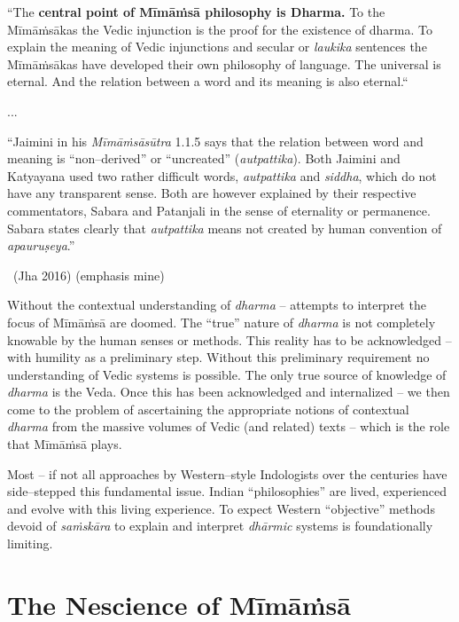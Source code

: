 \begin{myquote}
“The \textbf{central point of Mīmāṁsā philosophy is Dharma.} To the Mīmāṁsākas the Vedic injunction is the proof for the existence of dharma. To explain the meaning of Vedic injunctions and secular or \textit{laukika} sentences the Mīmāṁsākas have developed their own philosophy of language. The universal is eternal. And the relation between a word and its meaning is also eternal.“
\end{myquote}

\begin{myquote}
...
\end{myquote}

\begin{myquote}
“Jaimini in his \textit{Mīmāṁsāsūtra} 1.1.5 says that the relation between word and meaning is “non–derived” or “uncreated” (\textit{autpattika}). Both Jaimini and Katyayana used two rather difficult words, \textit{autpattika} and \textit{siddha}, which do not have any transparent sense. Both are however explained by their respective commentators, Sabara and Patanjali in the sense of eternality or permanence. Sabara states clearly that \textit{autpattika} means not created by human convention of \textit{apauruṣeya}.”

~\hfill (Jha 2016) (emphasis mine)
\end{myquote}

Without the contextual understanding of \textit{dharma }– attempts to interpret the focus of Mīmāṁsā are doomed. The “true” nature of \textit{dharma} is not completely knowable by the human senses or methods. This reality has to be acknowledged – with humility as a preliminary step. Without this preliminary requirement no understanding of Vedic systems is possible. The only true source of knowledge of \textit{dharma} is the Veda. Once this has been acknowledged and internalized – we then come to the problem of ascertaining the appropriate notions of contextual \textit{dharma} from the massive volumes of Vedic (and related) texts – which is the role that Mīmāṁsā plays.

Most – if not all approaches by Western–style Indologists over the centuries have side–stepped this fundamental issue. Indian “philosophies” are lived, experienced and evolve with this living experience. To expect Western “objective” methods devoid of \textit{saṁskāra} to explain and interpret \textit{dhārmic} systems is foundationally limiting.


\section*{The Nescience of Mīmāṁsā}

